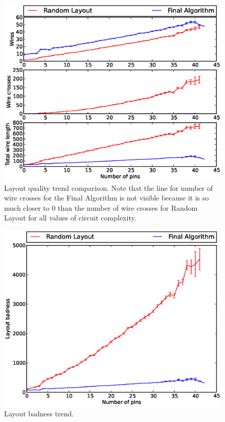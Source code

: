 \begin{figure}
\begin{center}
\includegraphics[width=\textwidth]{Images/final_algorithm_quality_trend.eps}
\caption[Combined algorithm layout quality trend]{Layout quality trend
comparison. Note that the line for number of wire crosses for the Final
Algorithm is not visible because it is so much closer to $0$ than the number
of wire crosses for Random Layout for all values of circuit complexity.}
\label{fig:final_quality_trend}
\end{center}
\end{figure}

\begin{figure}
\begin{center}
\includegraphics[width=\textwidth]{Images/final_algorithm_badness_trend.eps}
\caption[Combined algorithm layout badness trend]{Layout badness trend.}
\label{fig:final_badness_trend}
\end{center}
\end{figure}
